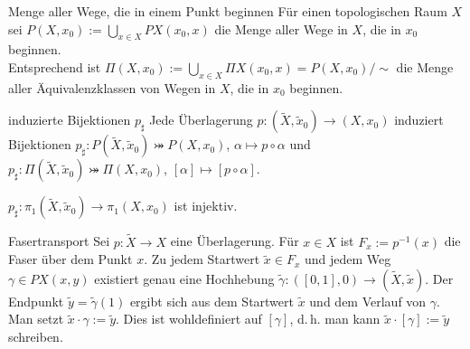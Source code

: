 \begin{Def}{Menge aller Wege, die in einem Punkt beginnen}
    Für einen topologischen Raum $X$ sei
    $P(X, x_0) := \bigcup_{x \in X} PX(x_0, x)$ die Menge aller Wege in $X$,
    die in $x_0$ beginnen. \\
    Entsprechend ist $\Pi(X, x_0) := \bigcup_{x \in X} \Pi X(x_0, x) =
    P(X, x_0)/\sim$ die Menge aller Äquivalenzklassen von Wegen in $X$,
    die in $x_0$ beginnen.
\end{Def}

\begin{Satz}{induzierte Bijektionen $p_\sharp$}
    Jede Überlagerung
    $p\colon (\widetilde{X}, \widetilde{x}_0) \rightarrow (X, x_0)$
    induziert Bijektionen
    $p_\sharp\colon P(\widetilde{X}, \widetilde{x}_0) \bij P(X, x_0)$,
    $\alpha \mapsto p \circ \alpha$ und
    $p_\sharp\colon \Pi(\widetilde{X}, \widetilde{x}_0) \bij \Pi(X, x_0)$,
    $[\alpha] \mapsto [p \circ \alpha]$.
\end{Satz}

\begin{Kor}
    $p_\sharp\colon \pi_1(\widetilde{X}, \widetilde{x}_0) \rightarrow
    \pi_1(X, x_0)$ ist injektiv.
\end{Kor}

\linie

\begin{Def}{Fasertransport}
    Sei $p\colon \widetilde{X} \rightarrow X$ eine Überlagerung.
    Für $x \in X$ ist $F_x := p^{-1}(x)$ die Faser über dem Punkt $x$.
    Zu jedem Startwert $\widetilde{x} \in F_x$ und jedem Weg
    $\gamma \in PX(x, y)$ existiert genau eine Hochhebung
    $\widetilde{\gamma}\colon ([0, 1], 0) \rightarrow
    (\widetilde{X}, \widetilde{x})$.
    Der Endpunkt $\widetilde{y} = \widetilde{\gamma}(1)$ ergibt sich aus
    dem Startwert $\widetilde{x}$ und dem Verlauf von $\gamma$.
    Man setzt $\widetilde{x} \cdot \gamma := \widetilde{y}$.
    Dies ist wohldefiniert auf $[\gamma]$, d.\,h. man kann
    $\widetilde{x} \cdot [\gamma] := \widetilde{y}$ schreiben.
\end{Def}

